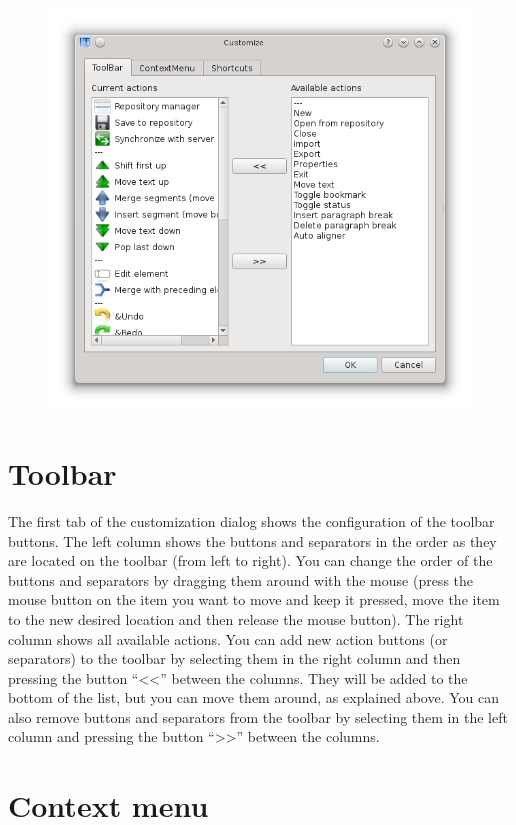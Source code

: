 \documentclass[a4paper,10pt,oneside]{book}
\begin{document}
\begin{figure}[htb]
 \includegraphics[width=\textwidth]{screenshots/customize_toolbar.png}
\end{figure}

\section{Toolbar}\label{ch:detail:custom:toolbar}

The first tab of the customization dialog shows the configuration of the toolbar buttons. The left column shows the buttons and separators in the order as they are located on the toolbar (from left to right). You can change the order of the buttons and separators by dragging them around with the mouse (press the mouse button on the item you want to move and keep it pressed, move the item to the new desired location and then release the mouse button).
The right column shows all available actions. You can add new action buttons (or separators) to the toolbar by selecting them in the right column and then pressing the button ``<<'' between the columns. They will be added to the bottom of the list, but you can move them around, as explained above. You can also remove buttons and separators from the toolbar by selecting them in the left column and pressing the button ``>>'' between the columns.

\section{Context menu}\label{ch:detail:custom:contextmenu}
\end{document}

